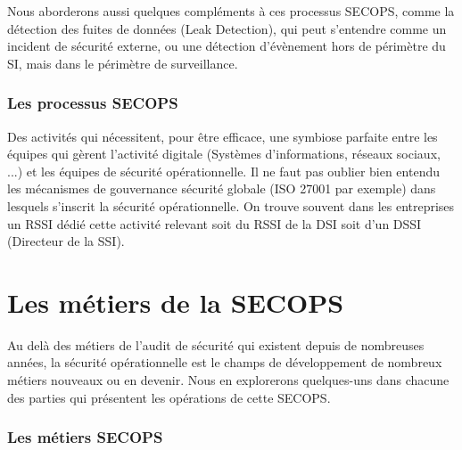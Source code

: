 Nous aborderons aussi quelques compléments à ces processus SECOPS, comme la détection des fuites de données (Leak Detection), qui peut s'entendre comme un incident de sécurité externe, ou une détection d'évènement hors de périmètre du SI, mais dans le périmètre de surveillance.

\begin{frame}
\frametitle<presentation>{Les processus SECOPS}

\end{frame}

Des activités qui nécessitent, pour être efficace, une symbiose parfaite entre les équipes qui gèrent l'activité digitale (Systèmes d'informations, réseaux sociaux, ...) et les équipes de sécurité opérationnelle.
Il ne faut pas oublier bien entendu les mécanismes de gouvernance sécurité globale (ISO 27001 par exemple) dans lesquels s'inscrit la sécurité opérationnelle. On trouve souvent dans les entreprises un RSSI dédié cette activité relevant soit du RSSI de la DSI soit d'un DSSI (Directeur de la SSI).

\section{Les métiers de la SECOPS}

Au delà des métiers de l'audit de sécurité qui existent depuis de nombreuses années, la sécurité opérationnelle est le champs de développement de nombreux métiers nouveaux ou en devenir. Nous en explorerons quelques-uns dans chacune des parties qui présentent les opérations de cette SECOPS.

\begin{frame}
\frametitle<presentation>{Les métiers SECOPS}
\end{frame}


